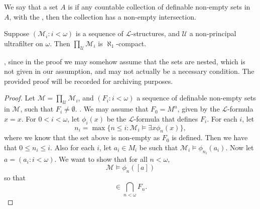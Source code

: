 \documentclass[notoc,notitlepage]{tufte-book}
\begin{document}
\begin{defn}\label{defn:_aleph_1_compact}
  We say that a set $A$ is  if any countable collection of definable non-empty sets in $A$, with the , then the collection has a non-empty intersection.
\end{defn}

\begin{propo}\label{propo:ultraproducts_with_a_non_principal_ultrafilter_is_aleph_1_compact}
  Suppose $(\mathcal{M}_i : i < \omega)$ is a sequence of $\mathcal{L}$-structures, and $\mathcal{U}$ a non-principal ultrafilter on $\omega$. Then $\prod_{\mathcal{U}} \mathcal{M}_i$ is $\aleph_1$-compact.
\end{propo}

\begin{note}
  , since in the proof we may somehow assume that the sets are nested, which is not given in our assumption, and may not actually be a necessary condition. The provided proof will be recorded for archiving purposes. 
\end{note}

\begin{proof}
  Let $\mathcal{M} = \prod_{\mathcal{U}} \mathcal{M}_i$, and $(F_i : i < \omega)$ a sequence of definable non-empty sets in $\mathcal{M}$, such that $F_i \neq \emptyset$. . We may assume that $F_0 = M^n$, given by the $\mathcal{L}$-formula $x = x$. For $0 < i < \omega$, let $\phi_i(x)$ be the $\mathcal{L}$-formula that defines $F_i$. For each $i$, let
  \begin{equation*}
    n_i = \max \{ n \leq i : \mathcal{M}_i \models \exists x \phi_n(x) \},
  \end{equation*}
  where we know that the set above is non-empty as $F_0$ is defined. Then we have that $0 \leq n_i \leq i$. Also for each $i$, let $a_i \in M_i$ be such that $\mathcal{M}_i \models \phi_{n_i}(a_i)$. Now let $a = (a_i : i < \omega)$. We want to show that for all $n < \omega$,
  \begin{equation*}
    \mathcal{M} \models \phi_n([a])
  \end{equation*}
  so that
  \begin{equation*}
    [a] \in \bigcap_{n < \omega} F_n.
  \end{equation*}
   
\end{proof}
\end{document}
